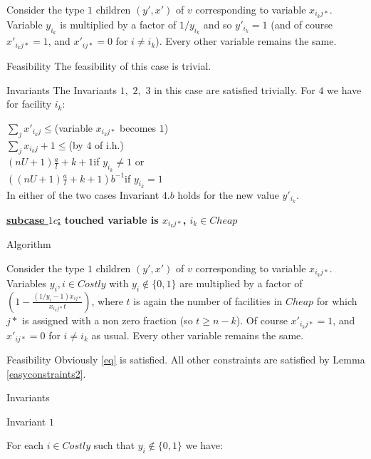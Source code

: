 \documentclass[11pt]{article}\usepackage{amsmath}
\begin{document}
Consider the type $1$ children $(y',x')$ of $v$ corresponding to variable $x_{i_kj*}$. Variable $y_{i_k}$ is multiplied by a factor of $1/y_{i_k}$ and so  $y'_{i_k}=1$ (and  of course $x'_{i_kj*}=1$, and $x'_{ij*}=0$ for $i\neq i_k$). Every other variable remains the same.


{\sc Feasibility}
The feasibility of this case is trivial.

{\sc Invariants}
The Invariants $1,$ $2,$ $3$ in this case are satisfied trivially. For $4$ we have for facility $i_k$:

\iffalse --------- previous derivation 
\noindent
$\sum_j x'_{i_kj}\leq$\hfill (variable $x_{i_kj*}$ becomes $1$)\\
$ \sum_j x_{i_kj} + 1\leq$\hfill (by $4$ of i.h.)\\
$ (nU+1)\frac{a}{l}+k +1 \leq$\hfill (being very generous)\\
$((nU+1)\frac{a}{l}+k)(1+o(1))b^{-1}$
-------------------- \fi 
\noindent
$\sum_j x'_{i_kj}\leq$\hfill (variable $x_{i_kj*}$ becomes $1$)\\
$ \sum_j x_{i_kj} + 1\leq$\hfill (by $4$ of i.h.)\\
$(nU+1)\frac{a}{l}+k+1$\hfill  if $y_{i_k} \neq 1$  or \\
$((nU+1)\frac{a}{l}+k+1)b^{-1}$\hfill if $y_{i_k} =1$\\ 

In either of the two cases Invariant $4.b$ holds for the new value $y'_{i_k}.$



\medskip
\noindent
{\bf \underline{subcase  $1c$:} touched variable is  $x_{i_kj*}$, $i_k \in Cheap$}

{\sc Algorithm}

Consider the type $1$ children $(y',x')$ of $v$ corresponding to variable $x_{i_kj*}$. Variables $y_{i}, i \in Costly$ with $y_{i}\notin \{0,1\}$ are multiplied by a factor of $(1-\frac{(1/y_{i}-1)x_{ij*}}{x_{i_kj*}t})$, where $t$ is again the number of
facilities in $Cheap$ for which $j*$ is assigned with a non zero fraction (so $t \geq n-k$).
Of course $x'_{i_kj*}=1$, and $x'_{ij*}=0$ for $i\neq i_k$ as usual. Every other variable remains the same.


{\sc Feasibility}
Obviously \eqref{eq} is satisfied. All other constraints are satisfied by 
Lemma \ref{easyconstraints2}.

{\sc Invariants}

{\sf Invariant $1$}

For each $i \in Costly$ such that $y_{i}\notin \{0,1\}$ we have:
\end{document}
